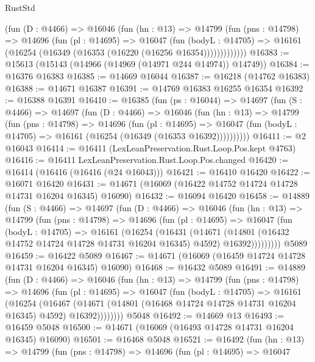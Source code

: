 \begin{lexlean}{RustStd}
\begin{coremodule}
          (fun (D : @4466) =>
          @16046
            (fun (hn : @13) =>
            @14799
              (fun (pns : @14798) =>
              @14696
                (fun (pl : @14695) =>
                @16047
                  (fun (bodyL : @14705) =>
                  @16161 (@16254 (@16349 (@16353 (@16220 (@16256 @16354)))))))))))))
@16383 := @15613 (@15143 (@14966 (@14969 (@14971 @244 @14974)) @14749))
@16384 := @16376 @16383
@16385 := @14669 @16044
@16387 := @16218 (@14762 @16383)
@16388 := @14671 @16387
@16391 := @14769 @16383 @16255 @16354
@16392 := @16388 @16391
@16410 := @16385
    (fun (ps : @16044) =>
    @14697
      (fun (S : @4466) =>
      @14697
        (fun (D : @4466) =>
        @16046
          (fun (hn : @13) =>
          @14799
            (fun (pns : @14798) =>
            @14696
              (fun (pl : @14695) =>
              @16047 (fun (bodyL : @14705) => @16161 (@16254 (@16349 (@16353 @16392))))))))))
@16411 := @2 @16043
@16414 := @16411 (LexLeanPreservation.Rust.Loop.Pos.kept @4763)
@16416 := @16411 LexLeanPreservation.Rust.Loop.Pos.changed
@16420 := @16414 (@16416 (@16416 (@24 @16043)))
@16421 := @16410 @16420
@16422 := @16071 @16420
@16431 := @14671 (@16069 (@16422 @14752 @14724 @14728 @14731 @16204 @16345) @16090)
@16432 := @16094 @16420
@16458 := @14889
    (fun (S : @4466) =>
    @14697
      (fun (D : @4466) =>
      @16046
        (fun (hn : @13) =>
        @14799
          (fun (pns : @14798) =>
          @14696
            (fun (pl : @14695) =>
            @16047
              (fun (bodyL : @14705) =>
              @16161
                (@16254
                  (@16431
                    (@14671
                      (@14801 (@16432 @14752 @14724 @14728 @14731 @16204 @16345) @4592)
                      @16392)))))))))
    @5089
@16459 := @16422 @5089
@16467 := @14671 (@16069 (@16459 @14724 @14728 @14731 @16204 @16345) @16090)
@16468 := @16432 @5089
@16491 := @14889
    (fun (D : @4466) =>
    @16046
      (fun (hn : @13) =>
      @14799
        (fun (pns : @14798) =>
        @14696
          (fun (pl : @14695) =>
          @16047
            (fun (bodyL : @14705) =>
            @16161
              (@16254
                (@16467
                  (@14671 (@14801 (@16468 @14724 @14728 @14731 @16204 @16345) @4592) @16392))))))))
    @5048
@16492 := @14669 @13
@16493 := @16459 @5048
@16500 := @14671 (@16069 (@16493 @14728 @14731 @16204 @16345) @16090)
@16501 := @16468 @5048
@16521 := @16492
    (fun (hn : @13) =>
    @14799
      (fun (pns : @14798) =>
      @14696
        (fun (pl : @14695) =>
        @16047

\end{coremodule}
\end{lexlean}
